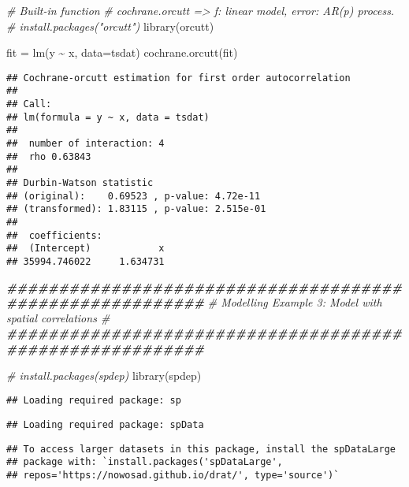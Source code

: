 \documentclass[
]{article}
\newenvironment{Shaded}{\begin{snugshade}}{\end{snugshade}}
\newcommand{\AttributeTok}[1]{\textcolor[rgb]{0.77,0.63,0.00}{#1}}
\newcommand{\CommentTok}[1]{\textcolor[rgb]{0.56,0.35,0.01}{\textit{#1}}}
\newcommand{\DocumentationTok}[1]{\textcolor[rgb]{0.56,0.35,0.01}{\textbf{\textit{#1}}}}
\newcommand{\FunctionTok}[1]{\textcolor[rgb]{0.00,0.00,0.00}{#1}}
\newcommand{\NormalTok}[1]{#1}
\newcommand{\OtherTok}[1]{\textcolor[rgb]{0.56,0.35,0.01}{#1}}
\newcommand{\SpecialCharTok}[1]{\textcolor[rgb]{0.00,0.00,0.00}{#1}}
\begin{document}
\begin{Shaded}
\begin{Highlighting}[]
\CommentTok{\# Built{-}in function }
\CommentTok{\# cochrane.orcutt =\textgreater{} f: linear model, error: AR(p) process.}
\CommentTok{\# install.packages("orcutt")}
\FunctionTok{library}\NormalTok{(orcutt)}

\NormalTok{fit }\OtherTok{=} \FunctionTok{lm}\NormalTok{(y }\SpecialCharTok{\textasciitilde{}}\NormalTok{ x, }\AttributeTok{data=}\NormalTok{tsdat)}
\FunctionTok{cochrane.orcutt}\NormalTok{(fit)}
\end{Highlighting}
\end{Shaded}

\begin{verbatim}
## Cochrane-orcutt estimation for first order autocorrelation 
##  
## Call:
## lm(formula = y ~ x, data = tsdat)
## 
##  number of interaction: 4
##  rho 0.63843
## 
## Durbin-Watson statistic 
## (original):    0.69523 , p-value: 4.72e-11
## (transformed): 1.83115 , p-value: 2.515e-01
##  
##  coefficients: 
##  (Intercept)            x 
## 35994.746022     1.634731
\end{verbatim}

\begin{Shaded}
\begin{Highlighting}[]
\DocumentationTok{\#\#\#\#\#\#\#\#\#\#\#\#\#\#\#\#\#\#\#\#\#\#\#\#\#\#\#\#\#\#\#\#\#\#\#\#\#\#\#\#\#\#\#\#\#\#\#\#\#\#\#\#\#\#\#\#\#}
\CommentTok{\# Modelling Example 3:  Model with spatial correlations \#}
\DocumentationTok{\#\#\#\#\#\#\#\#\#\#\#\#\#\#\#\#\#\#\#\#\#\#\#\#\#\#\#\#\#\#\#\#\#\#\#\#\#\#\#\#\#\#\#\#\#\#\#\#\#\#\#\#\#\#\#\#\#}

\CommentTok{\# install.packages(\textquotesingle{}spdep\textquotesingle{})}
\FunctionTok{library}\NormalTok{(spdep)}
\end{Highlighting}
\end{Shaded}

\begin{verbatim}
## Loading required package: sp
\end{verbatim}

\begin{verbatim}
## Loading required package: spData
\end{verbatim}

\begin{verbatim}
## To access larger datasets in this package, install the spDataLarge
## package with: `install.packages('spDataLarge',
## repos='https://nowosad.github.io/drat/', type='source')`
\end{verbatim}
\end{document}
